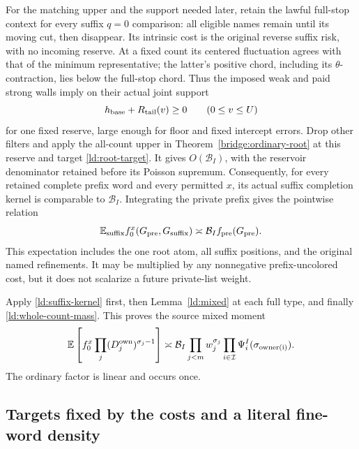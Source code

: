 For the matching upper and the support needed later, retain the
lawful full-stop context for every suffix \(q=0\) comparison:
all eligible names remain until its moving cut, then disappear.
Its intrinsic cost is the original reverse suffix risk, with no
incoming reserve.  At a fixed count its centered fluctuation agrees
with that of the minimum representative; the latter's positive
chord, including its \(\theta\)-contraction, lies below the
full-stop chord.  Thus the imposed weak and paid strong walls
imply on their actual joint support
\begin{equation}
 h_{\rm base}+R_{\rm tail}(v)\ge0\qquad(0\le v\le U)
 \label{ld:global-ordinary-wall}
\end{equation}
for one fixed reserve, large enough for floor and fixed intercept
errors.  Drop other filters and apply the all-count upper in
Theorem~\ref{bridge:ordinary-root} at this reserve and target
\eqref{ld:root-target}.  It gives \(O(\mathcal B_I)\), with the
reservoir denominator retained before its Poisson supremum.
Consequently, for every retained complete prefix word and every
permitted \(x\), its actual suffix completion kernel is comparable
to \(\mathcal B_I\).  Integrating the private prefix gives the
pointwise relation
\begin{equation}
 \mathbb E_{\rm suffix}f_0^x(G_{\rm pre},G_{\rm suffix})
        \asymp\mathcal B_I f_{\rm pre}(G_{\rm pre}).
 \label{ld:suffix-kernel}
\end{equation}
This expectation includes the one root atom, all suffix positions,
and the original named refinements.  It may be multiplied by any
nonnegative prefix-uncolored cost, but it does not scalarize a
future private-list weight.

Apply \eqref{ld:suffix-kernel} first, then Lemma~\ref{ld:mixed}
at each full type, and finally \eqref{ld:whole-count-mass}.  This
proves the source mixed moment
\begin{equation}
 \mathbb E\left[f_0^x\prod_j(D_j^{\rm own})^{\sigma_j-1}\right]
 \asymp\mathcal B_I\prod_{j<m}w_j^{\sigma_j}
                  \prod_{i\in\mathcal I}\Psi_i^I(\sigma_{\rm owner(i)}).
 \label{ld:source-mixed}
\end{equation}
The ordinary factor is linear and occurs once.

\subsection{Targets fixed by the costs and a literal fine-word density}

